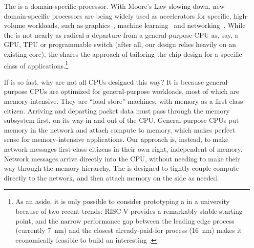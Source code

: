 The \name{} is a domain-specific processor. 
With Moore's Law slowing down, new domain-specific processors are being widely used as accelerators for specific, high-volume workloads, such as graphics~\cite{nvidia-geforce}, machine learning~\cite{tensorflow} and networking~\cite{RMT}. 
While the \name{} is not nearly as radical a departure from a general-purpose CPU as, say, a GPU, TPU or programmable switch (after all, our design relies heavily on an existing core), the \name{} shares the approach of tailoring the chip design for a specific class of applications.\footnote{As an aside, it is only possible to consider prototyping a \name{} in a university because of two recent trends: RISC-V provides a remarkably stable starting point, and the narrow performance gap between the leading edge process (currently \SI{7}{nm}) and the closest already-paid-for process (\SI{16}{nm}) makes it economically feasible to build an interesting \name{}.}

If \name{} is so fast, why are not all CPUs designed this way? 
It is because general-purpose CPUs are optimized for general-purpose workloads, most of which are memory-intensive. 
They are ``load-store'' machines, with memory as a first-class citizen. 
Arriving and departing packet data must pass through the memory subsystem first, on its way in and out of the CPU. 
General-purpose CPUs put memory in the network and attach compute to memory, which makes perfect sense for memory-intensive applications.
Our approach is, instead, to make network messages first-class citizens in their own right, independent of memory. 
Network messages arrive directly into the CPU, without needing to make their way through the memory hierarchy. 
The \name{} is designed to tightly couple compute directly to the network, and then attach memory on the side as needed.

